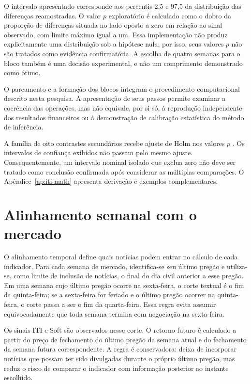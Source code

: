 O intervalo apresentado corresponde aos percentis 2,5 e 97,5 da distribuição das diferenças reamostradas. O valor $p$ exploratório é calculado como o dobro da proporção de diferenças situada no lado oposto a zero em relação ao sinal observado, com limite máximo igual a um. Essa implementação não produz explicitamente uma distribuição sob a hipótese nula; por isso, seus valores $p$ não são tratados como evidência confirmatória. A escolha de quatro semanas para o bloco também é uma decisão experimental, e não um comprimento demonstrado como ótimo.

O pareamento e a formação dos blocos integram o procedimento computacional descrito nesta pesquisa. A apresentação de seus passos permite examinar a coerência das operações, mas não equivale, por si só, à reprodução independente dos resultados financeiros ou à demonstração de calibração estatística do método de inferência.

A família de oito contrastes secundários recebe ajuste de Holm nos valores $p$ \cite{holm1979multiple}. Os intervalos de confiança exibidos não passam pelo mesmo ajuste. Consequentemente, um intervalo nominal isolado que exclua zero não deve ser tratado como conclusão confirmada após considerar as múltiplas comparações. O Apêndice~\ref{ap:iti-math} apresenta derivação e exemplos complementares.

\section{Alinhamento semanal com o mercado}

O alinhamento temporal define quais notícias podem entrar no cálculo de cada indicador. Para cada semana de mercado, identifica-se seu último pregão e utiliza-se, como limite de inclusão de notícias, o final do dia civil anterior a esse pregão. Em uma semana cujo último pregão ocorre na sexta-feira, o corte textual é o fim da quinta-feira; se a sexta-feira for feriado e o último pregão ocorrer na quinta-feira, o corte passa a ser o fim da quarta-feira. Essa regra evita assumir equivocadamente que toda semana termina com negociação na sexta-feira.

Os sinais ITI e Soft são observados nesse corte. O retorno futuro é calculado a partir do preço de fechamento do último pregão da semana atual e do fechamento da semana futura correspondente. A regra é conservadora: deixa de incorporar notícias que possam ter sido divulgadas durante o próprio último pregão, mas reduz o risco de comparar o indicador com informação posterior ao instante escolhido.

